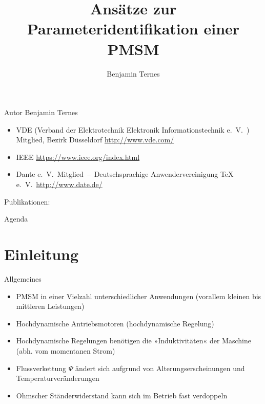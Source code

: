 \documentclass{beamer}
\title[Parameteridentifikation]{Ansätze zur Parameteridentifikation einer PMSM}
\author[Benjamin Ternes]%
{%
Benjamin Ternes
}
\institute{%
Hochschule Bochum\\
Fachbereich Elektrotechnik und Informatik}
\begin{document}
\begin{frame}[plain]
	\titlepage
\end{frame}

\begin{frame}[plain]{Autor}
Benjamin Ternes
\begin{itemize}
	\item VDE (Verband der Elektrotechnik Elektronik Informationstechnik e.\ V.\ ) Mitglied, Bezirk Düsseldorf	\url{http://www.vde.com/}
	\item IEEE \url{https://www.ieee.org/index.html}
	\item Dante e.\ V.\ Mitglied~--~Deutschsprachige Anwendervereinigung TeX e.\ V.\ \url{http://www.date.de/}
\end{itemize}
\vspace{1cm}
Publikationen:\\
\end{frame}

\begin{frame}[plain]{Agenda}
	\tableofcontents
\end{frame}

\section{Einleitung}
\begin{frame}{Allgemeines}
\begin{itemize}
\pause \item PMSM in einer Vielzahl unterschiedlicher Anwendungen (vorallem kleinen bis mittleren Leistungen)
\pause \item Hochdynamische Antriebsmotoren (hochdynamische Regelung)
\pause \item Hochdynamische Regelungen benötigen die »Induktivitäten« der Maschine (abh. vom momentanen Strom)
\pause \item Flussverkettung $\Psi$ ändert sich aufgrund von Alterungserscheinungen und Temperaturveränderungen
\pause \item Ohmscher Ständerwiderstand kann sich im Betrieb fast verdoppeln
\end{itemize}
\end{frame}
\end{document}
